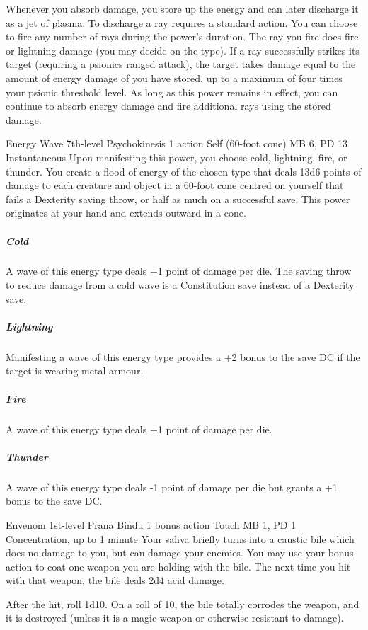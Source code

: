   Whenever you absorb damage,
  you store up the energy and can later discharge it
  as a jet of plasma.
  To discharge a ray requires a standard action.
  You can choose to fire any number of rays
  during the power's duration.
  The ray you fire does fire or lightning damage
  (you may decide on the type).
  If a ray successfully strikes its target
  (requiring a psionics ranged attack),
  the target takes damage equal to the amount of energy damage
  of you have stored,
  up to a maximum of four times your psionic threshold level.
  As long as this power remains in effect,
  you can continue to absorb energy damage and
  fire additional rays using the stored damage.

\DndPowerHeader%
  {Energy Wave}
  {7th-level Psychokinesis}
  {1 action}
  {Self (60-foot cone)}
  {MB 6, PD 13}
  {Instantaneous}
  Upon manifesting this power,
  you choose cold, lightning, fire, or thunder.
  You create a flood of energy of the chosen type
  that deals 13d6 points of damage
  to each creature and object in a 60-foot cone
  centred on yourself
  that fails a Dexterity saving throw,
  or half as much on a successful save.
  This power originates at your hand
  and extends outward in a cone.
  \subparagraph{Cold}
    A wave of this energy type deals +1 point
    of damage per die.
    The saving throw to reduce damage from a cold wave
    is a Constitution save instead of a Dexterity save.  
  \subparagraph{Lightning}
    Manifesting a wave of this energy type
    provides a +2 bonus to the save DC if the target is wearing
    metal armour.
  \subparagraph{Fire}
    A wave of this energy type deals +1 point of damage per die.
  \subparagraph{Thunder}
    A wave of this energy type deals -1 point of damage per die
    but grants a +1 bonus to the save DC.

\DndPowerHeader%
  {Envenom}
  {1st-level Prana Bindu}
  {1 bonus action}
  {Touch}
  {MB 1, PD 1}
  {Concentration, up to 1 minute}
Your saliva briefly turns into a caustic bile
which does no damage to you,
but can damage your enemies.
You may use your bonus action to coat one weapon
you are holding with the bile.
The next time you hit with that weapon,
the bile deals 2d4 acid damage.

After the hit, roll 1d10.
On a roll of 10,
the bile totally corrodes the weapon,
and it is destroyed
(unless it is a magic weapon or otherwise resistant
to damage).

